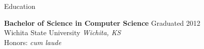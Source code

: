 \documentclass{resume} %
\begin{document}







\begin{rSection}{Education}

{\bf Bachelor of Science in Computer Science} \hfill Graduated 2012\\
Wichita State University \hfill \textit{Wichita, KS}\\
Honors: {\it cum laude}



\end{rSection}
\end{document}
